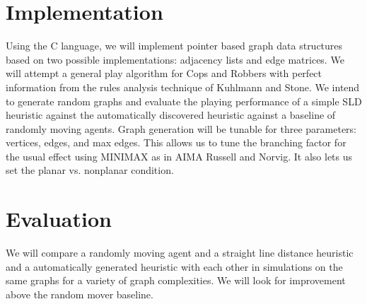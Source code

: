 \documentclass{article}
\begin{document}
\section{Implementation}
Using the C language, we will implement pointer based graph data structures
based on two possible implementations: adjacency lists and edge matrices. We will
attempt a general play algorithm for Cops and Robbers with perfect information
from the rules analysis technique of Kuhlmann and Stone.
We intend to generate random graphs and evaluate the playing performance 
of a simple SLD heuristic against the automatically discovered heuristic against
a baseline of randomly moving agents.
Graph generation will be tunable for three parameters: vertices, edges, and 
max edges. This allows us to tune the branching factor for the usual effect 
using MINIMAX as in AIMA Russell and Norvig. It also lets us set the planar vs.
nonplanar condition.

\section{Evaluation}
We will compare a randomly moving agent and a straight line distance heuristic
and a automatically generated heuristic with each other in simulations on the 
same graphs for a variety of graph complexities. We will look for improvement 
above the random mover baseline.

\begin{thebibliography}{9}
\end{thebibliography}
\end{document}
